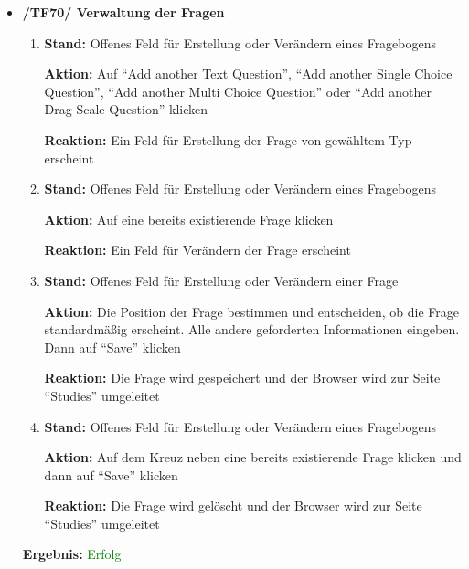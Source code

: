 \documentclass[a4paper]{scrreprt}
\begin{document}
\begin{itemize}
                \item \textbf{/TF70/ Verwaltung der Fragen}
                        \begin{enumerate}
                        \item \par \textbf{Stand: }Offenes Feld f\"ur Erstellung oder Ver\"andern eines Fragebogens
                              \par \textbf{Aktion: }Auf ``Add another Text Question'', ``Add another Single Choice Question'', ``Add another Multi Choice Question'' oder ``Add another Drag Scale Question'' klicken
                              \par \textbf{Reaktion: }Ein Feld f\"ur Erstellung der Frage von gew\"ahltem Typ erscheint         
                        \item \par \textbf{Stand: }Offenes Feld f\"ur Erstellung oder Ver\"andern eines Fragebogens
                              \par \textbf{Aktion: }Auf eine bereits existierende Frage klicken
                              \par \textbf{Reaktion: }Ein Feld f\"ur Ver\"andern der Frage erscheint                                                     
                        \item \par \textbf{Stand: }Offenes Feld f\"ur Erstellung oder Ver\"andern einer Frage
                              \par \textbf{Aktion: }Die Position der Frage bestimmen und entscheiden, ob die Frage standardm\"aßig erscheint. Alle andere geforderten Informationen eingeben. Dann auf ``Save'' klicken
                              \par \textbf{Reaktion: }Die Frage wird gespeichert und der Browser wird zur Seite ``Studies'' umgeleitet    
                        \item \par \textbf{Stand: }Offenes Feld f\"ur Erstellung oder Ver\"andern eines Fragebogens
                              \par \textbf{Aktion: }Auf dem Kreuz neben eine bereits existierende Frage klicken und dann auf ``Save'' klicken
                              \par \textbf{Reaktion: }Die Frage wird gel\"oscht und der Browser wird zur Seite ``Studies'' umgeleitet
                    \end{enumerate}
					\vspace*{0.3cm}
		           \par \textbf{Ergebnis: }\textcolor{green}{Erfolg}
		           \vspace*{0.6cm} 



\end{itemize}
\end{document}
